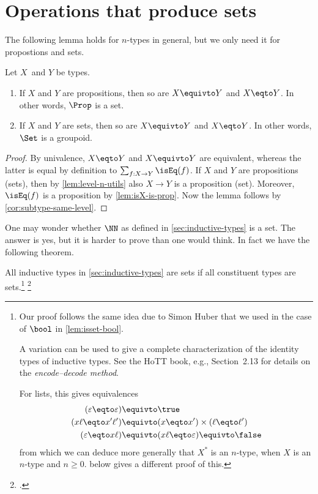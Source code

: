 \section{Operations that produce sets}
 \label{sec:operations-on-sets}


The following lemma holds for $n$-types in general,
but we only need it for propostions and sets.

\begin{lemma}\label{lem:Set-is-groupoid}
Let $X$ and $Y$ be types.
\begin{enumerate}
\item
If $X$ and $Y$ are propositions, then so are $X \equivto Y$ and $X \eqto Y$.
In other words, $\Prop$ is a set.
\item
If $X$ and $Y$ are sets, then so are $X \equivto Y$ and $X \eqto Y$.
In other words, $\Set$ is a groupoid.
\end{enumerate}
\end{lemma}

\begin{proof}
 By univalence, $X \eqto Y$ and $X\equivto Y$ are equivalent,
 whereas the latter is equal by definition to $\sum_{f:X\to Y} \isEq(f)$.
 If $X$ and $Y$ are propositions (sets),
 then by \cref{lem:level-n-utils} also $X\to Y$ is a proposition (set).
 Moreover, $\isEq(f)$ is a proposition by \cref{lem:isX-is-prop}.
 Now the lemma follows by \cref{cor:subtype-same-level}.
\end{proof}

One may wonder whether $\NN$ as defined in \cref{sec:inductive-types}
is a set. The answer is yes, but it is harder to prove than one
would think. In fact we have the following theorem.

\begin{theorem}\label{thm:isset-inductive-types}
  All inductive types in \cref{sec:inductive-types} are sets
  if all constituent types are sets.\footnote{%
    Our proof follows the same
    idea due to Simon Huber that we used in the
    case of $\bool$ in \cref{lem:isset-bool}.

    A variation can be used to give a complete
    characterization of the identity types of
    inductive types.
    See the HoTT book, e.g., Section~2.13 for details
    on the \emph{encode--decode method}.\footnotemark{}

    For lists, this gives equivalences
    \begin{align*}
      (\varepsilon \eqto \varepsilon) &\equivto \true \\
      (x\ell \eqto x'\ell') &\equivto (x \eqto x')\times(\ell \eqto \ell') \\
      (\varepsilon \eqto x\ell) &\equivto (x\ell \eqto \varepsilon) \equivto \false
    \end{align*}
    from which we can deduce more generally that $X^*$ is an $n$-type,
    when $X$ is an $n$-type and $n\ge 0$.
     below gives a different proof of this.}%
  \footcitetext{hottbook}
\end{theorem}

